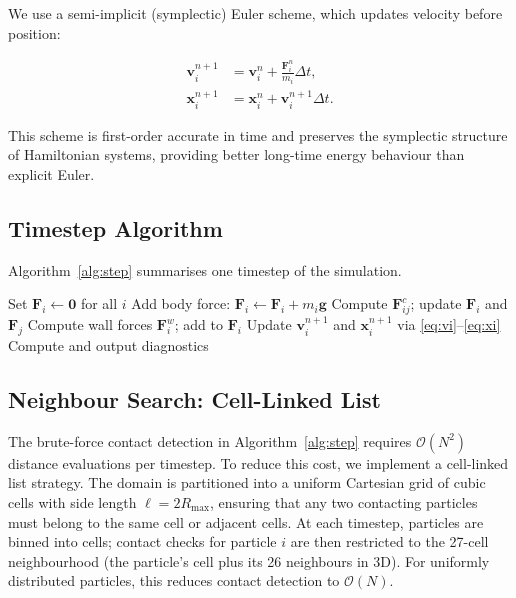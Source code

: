 \documentclass[conference]{IEEEtran}
\begin{document}
	We use a semi-implicit (symplectic) Euler scheme, which updates velocity
	before position:
	
	\begin{align}
		\mathbf{v}^{n+1}_i &= \mathbf{v}^n_i + \frac{\mathbf{F}^n_i}{m_i} \Delta t,
		\label{eq:vi} \\
		\mathbf{x}^{n+1}_i &= \mathbf{x}^n_i + \mathbf{v}^{n+1}_i \Delta t.
		\label{eq:xi}
	\end{align}
	
	This scheme is first-order accurate in time and preserves the symplectic
	structure of Hamiltonian systems, providing better long-time energy behaviour
	than explicit Euler.
	
	\subsection{Timestep Algorithm}
	
	Algorithm~\ref{alg:step} summarises one timestep of the simulation.
	
	\begin{algorithm}
		\caption{Single DEM Timestep}
		\label{alg:step}
		\begin{algorithmic}[1]
			\STATE Set $\mathbf{F}_i \leftarrow \mathbf{0}$ for all $i$
			\STATE Add body force: $\mathbf{F}_i \leftarrow \mathbf{F}_i + m_i \mathbf{g}$
			\STATE Compute $\mathbf{F}^c_{ij}$; update $\mathbf{F}_i$ and $\mathbf{F}_j$
			\ENDIF
			\ENDFOR
			\STATE Compute wall forces $\mathbf{F}^w_i$; add to $\mathbf{F}_i$
			\ENDFOR
			\STATE Update $\mathbf{v}^{n+1}_i$ and $\mathbf{x}^{n+1}_i$ via \eqref{eq:vi}--\eqref{eq:xi}
			\STATE Compute and output diagnostics
		\end{algorithmic}
	\end{algorithm}
	
	\subsection{Neighbour Search: Cell-Linked List}
	
	The brute-force contact detection in Algorithm~\ref{alg:step} requires
	$\mathcal{O}(N^2)$ distance evaluations per timestep. To reduce this cost,
	we implement a cell-linked list strategy. The domain is partitioned into a
	uniform Cartesian grid of cubic cells with side length $\ell = 2R_{\max}$,
	ensuring that any two contacting particles must belong to the same cell or
	adjacent cells. At each timestep, particles are binned into cells; contact
	checks for particle $i$ are then restricted to the 27-cell neighbourhood
	(the particle's cell plus its 26 neighbours in 3D). For uniformly distributed
	particles, this reduces contact detection to $\mathcal{O}(N)$.
	
\end{document}
